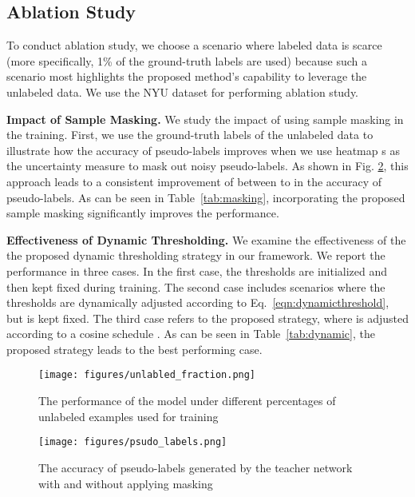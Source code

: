 \documentclass{article}
\begin{document}
\subsection{Ablation Study}
To conduct ablation study, we choose a scenario where labeled data is scarce (more specifically, 1\% of the ground-truth labels are used) because such a scenario most highlights the proposed method's capability to leverage the unlabeled data. We use the NYU dataset for performing ablation study.
\par
\textbf{Impact of Sample Masking.} We study the impact of using sample masking in the training. First, we use the ground-truth labels of the unlabeled data to illustrate how the accuracy of pseudo-labels improves when we use heatmap s as the uncertainty measure to mask out noisy pseudo-labels. As shown in Fig. \ref{fig:plabels},  this approach leads to a consistent improvement of between  to  in the accuracy of pseudo-labels. As can be seen in Table~\ref{tab:masking}, incorporating the proposed sample masking significantly improves the performance.
\par
\textbf{Effectiveness of Dynamic Thresholding.} We examine the effectiveness of the the proposed dynamic thresholding strategy in our framework. We report the performance in three cases. In the first case, the thresholds are initialized and then kept fixed during training. The second case includes scenarios where the thresholds are dynamically adjusted according to Eq.~\ref{eqn:dynamicthreshold}, but  is kept fixed. The third case refers to the proposed strategy, where  is adjusted according to a cosine schedule \cite{loshchilov2016sgdr}. As can be seen in Table~\ref{tab:dynamic}, the proposed strategy leads to the best performing case.
\par




\begin{figure}[t]
\centering
\texttt{[image: figures/unlabled\_fraction.png]}
\caption{The performance of the model under different percentages of unlabeled examples used for training}
\label{fig:semispu}
\end{figure}


\begin{figure}[t]
\centering
\texttt{[image: figures/psudo\_labels.png]}
\caption{The accuracy of pseudo-labels generated by the teacher network with and without applying masking}
\label{fig:plabels}
\end{figure}
\end{document}

